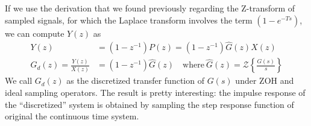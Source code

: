 \documentclass[twoside]{article}
\begin{document}
%
If we use the derivation that we found previously regarding the 
Z-transform of sampled signals, for which the Laplace transform involves the 
term $\left( 1 - e^{-T s} \right)$, we can compute $Y(z)$ as 
% 
\begin{align*}
Y(z) &= \left( 1 - z^{-1} \right) P(z) = \left( 1 - z^{-1} \right) 
\hat{G}(z) X(z)
\\
G_d(z) = \frac{Y(z)}{X(z)} &= \left( 1 - z^{-1} \right) \hat{G}(z) \quad \mathrm{where} \ \hat{G}(z) = \mathcal{Z} \left\lbrace 
\frac{G(s)}{s} \right\rbrace
\end{align*}
%
We call $G_d(z)$ as the discretized transfer function of $G(s)$
under ZOH and ideal sampling operators. The result is pretty interesting: the impulse response of the
``discretized'' system is obtained by sampling the step response function of original the 
continuous time system. 

\end{document}
